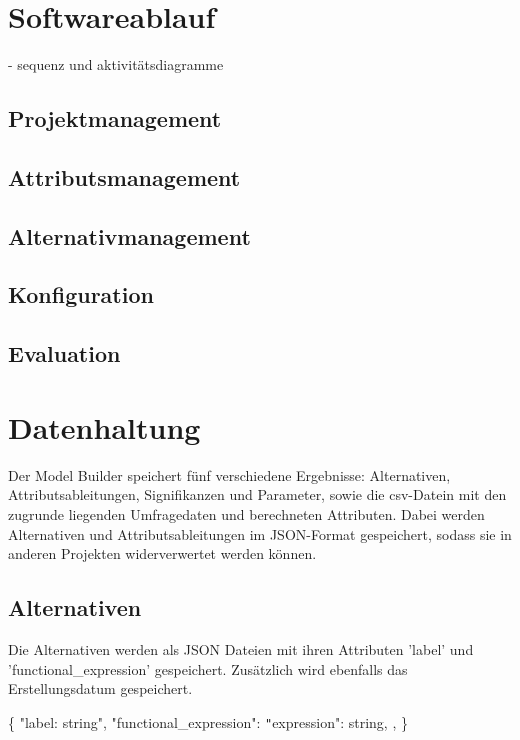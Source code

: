 \documentclass{article}
\begin{document}
\section{Softwareablauf}
- sequenz und aktivitätsdiagramme
\subsection{Projektmanagement}
\subsection{Attributsmanagement}
\subsection{Alternativmanagement}
\subsection{Konfiguration}
\subsection{Evaluation}


\section{Datenhaltung}

Der Model Builder speichert fünf verschiedene Ergebnisse: Alternativen, Attributsableitungen, Signifikanzen und Parameter, sowie die csv-Datein mit den zugrunde liegenden Umfragedaten und berechneten Attributen. Dabei werden Alternativen und Attributsableitungen im JSON-Format gespeichert, sodass sie in anderen Projekten widerverwertet werden können.

\subsection{Alternativen}
Die Alternativen werden als JSON Dateien mit ihren Attributen 'label' und 'functional\_expression' gespeichert. Zusätzlich wird ebenfalls das Erstellungsdatum gespeichert.

\newline
\{ \newline
    "label: string", \newline
    "functional\_expression": {\newline
        \texttt{"}expression": string, \newline
    }, \newline
\} \newline
\newline
\end{document}
